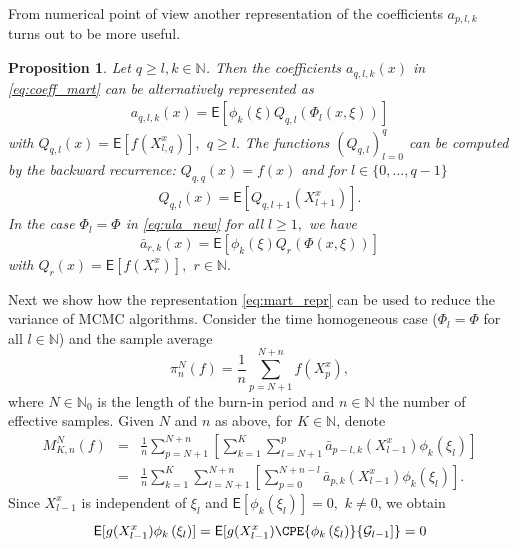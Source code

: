 \documentclass[bj]{imsart}
\def\PE{\mathsf{E}}
\def\nset{\mathbb{N}}
\newtheorem{prop}[thm]{Proposition}
\begin{document}
From  numerical point of view another representation of the coefficients \(a_{p,l,k}\)  turns out to be more useful.
\begin{prop}
Let $q\geq l, k\in \nset$. Then the coefficients \(a_{q,l,k}(x)\) in \eqref{eq:coeff_mart}  can be alternatively represented as
\begin{eqnarray*}
a_{q,l,k}(x)=\mathsf{E}\left[\phi_k\left(\xi\right)Q_{q,l}\left(\Phi_l(x,\xi)\right)\right]
\end{eqnarray*}
with \(Q_{q,l}(x)=\mathsf{E}\left[f(X^x_{l,q})\right],\) \(q\geq l.\)
The functions \((Q_{q,l})_{l=0}^q\)  can be computed by the backward recurrence: $Q_{q,q}(x)=f(x)$ and for $l \in \{0,\ldots,q-1\}$
\begin{eqnarray}
\label{eq:qpl}
Q_{q,l}(x)=\mathsf{E}\left[Q_{q,l+1}(X^x_{l+1})\right].
\end{eqnarray}
In the case $\Phi_l=\Phi$ in \eqref{eq:ula_new} for all $l\geq 1,$ we have
\begin{equation}
\label{eq:definition-bar-a}
\bar a_{r,k}(x)=\mathsf{E}\left[\phi_k\left(\xi\right)Q_{r}\left(\Phi(x,\xi)\right)\right]
\end{equation}
with  \(Q_{r}(x)=\mathsf{E}\left[f(X^x_{r})\right],\) $r\in \mathbb{N}.$
\end{prop}
\par
Next we show how  the representation \eqref{eq:mart_repr} can be used to  reduce the variance of MCMC algorithms.  Consider the time homogeneous case ($\Phi_l = \Phi$ for all $l \in \nset$) and the sample average
\begin{equation}\label{eq:29032018a2}
\pi_{n}^{N}(f)=\frac{1}{n}\sum_{p=N+1}^{N+n} f(X^x_{p}),
\end{equation}
where $N\in\mathbb N_0$ is the length of the burn-in period and $n\in\mathbb N$
the number of effective samples.
Given $N$ and $n$ as above, for $K\in\mathbb N$, denote
\begin{eqnarray}
\nonumber
M_{K,n}^N(f) &=&\frac{1}{n}\sum_{p=N+1}^{N+n}\left[\sum_{k=1}^{K}\sum_{l=N+1}^{p} \bar a_{p-l,k}(X^x_{l-1})\phi_k(\xi_{l})\right]
\\
&=& \frac{1}{n}\sum_{k=1}^{K}\sum_{l=N+1}^{N+n}\left[\sum_{p=0}^{N+n-l}\bar{a}_{p,k}(X_{l-1}^{x})\phi_{k}(\xi_{l})\right].
\label{eq:29032018a5}
\end{eqnarray}
Since \(X^x_{l-1}\) is independent of \(\xi_{l}\) and \(\mathsf{E}[\phi_k(\xi_{l})]=0,\) \(k\neq 0\), we obtain
\[
\PE[g(X^x_{l-1})\phi_{k}\left(\xi_{l}\right)] = \mathsf{E}[g(X^x_{l-1})\CPE{\phi_{k}\left(\xi_{l}\right)}{\mathcal{G}_{l-1}]} = 0
\]
\end{document}
